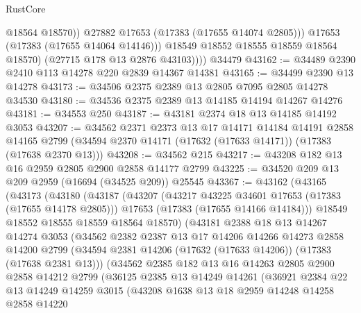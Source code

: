 \begin{lexlean}{RustCore}
\begin{coremodule}
                    @18564
                    @18570))
                @27882
                @17653
                (@17383 (@17655 @14074 @2805)))
              @17653
              (@17383 (@17655 @14064 @14146)))
            @18549
            @18552
            @18555
            @18559
            @18564
            @18570)
          (@27715 @178 @13 @2876 @43103))))
    @34479
@43162 := @34489 @2390 @2410 @113 @14278 @220 @2839 @14367 @14381
@43165 := @34499 @2390 @13 @14278
@43173 := @34506 @2375 @2389 @13 @2805 @7095 @2805 @14278 @34530
@43180 := @34536 @2375 @2389 @13 @14185 @14194 @14267 @14276
@43181 := @34553 @250
@43187 := @43181 @2374 @18 @13 @14185 @14192 @3053
@43207 := @34562
    @2371
    @2373
    @13
    @17
    @14171
    @14184
    @14191
    @2858
    @14165
    @2799
    (@34594 @2370 @14171 (@17632 (@17633 @14171)) (@17383 (@17638 @2370 @13)))
@43208 := @34562 @215
@43217 := @43208 @182 @13 @16 @2959 @2805 @2900 @2858 @14177 @2799
@43225 := @34520 @209 @13 @209 @2959 (@16694 (@34525 @209)) @25545
@43367 := @43162
    (@43165
      (@43173
        (@43180
          (@43187
            (@43207
              (@43217 @43225 @34601 @17653 (@17383 (@17655 @14178 @2805)))
              @17653
              (@17383 (@17655 @14166 @14184)))
            @18549
            @18552
            @18555
            @18559
            @18564
            @18570)
          (@43181
            @2388
            @18
            @13
            @14267
            @14274
            @3053
            (@34562
              @2382
              @2387
              @13
              @17
              @14206
              @14266
              @14273
              @2858
              @14200
              @2799
              (@34594 @2381 @14206 (@17632 (@17633 @14206)) (@17383 (@17638 @2381 @13)))
              (@34562
                @2385
                @182
                @13
                @16
                @14263
                @2805
                @2900
                @2858
                @14212
                @2799
                (@36125
                  @2385
                  @13
                  @14249
                  @14261
                  (@36921
                    @2384
                    @22
                    @13
                    @14249
                    @14259
                    @3015
                    (@43208
                      @1638
                      @13
                      @18
                      @2959
                      @14248
                      @14258
                      @2858
                      @14220

\end{coremodule}
\end{lexlean}
